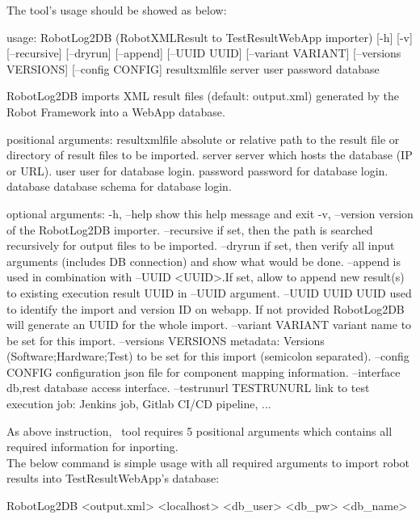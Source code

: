     The tool's usage should be showed as below:
\begin{robotlog}
usage: RobotLog2DB (RobotXMLResult to TestResultWebApp importer) [-h] [-v]
                    [--recursive] [--dryrun] [--append] [--UUID UUID]
                    [--variant VARIANT] [--versions VERSIONS] [--config CONFIG]
                    resultxmlfile server user password database

RobotLog2DB imports XML result files (default: output.xml) generated by the
                     Robot Framework into a WebApp database.

positional arguments:
resultxmlfile        absolute or relative path to the result file or directory
                     of result files to be imported.
server               server which hosts the database (IP or URL).
user                 user for database login.
password             password for database login.
database             database schema for database login.

optional arguments:
-h, --help           show this help message and exit
-v, --version        version of the RobotLog2DB importer.
--recursive          if set, then the path is searched recursively for output
                     files to be imported.
--dryrun             if set, then verify all input arguments (includes DB
                     connection) and show what would be done.
--append             is used in combination with --UUID <UUID>.If set, allow to
                     append new result(s) to existing execution result UUID in
                     --UUID argument.
--UUID UUID          UUID used to identify the import and version ID on webapp.
                     If not provided RobotLog2DB will generate an UUID for the
                     whole import.
--variant VARIANT    variant name to be set for this import.
--versions VERSIONS  metadata: Versions (Software;Hardware;Test) to be set for
                     this import (semicolon separated).
--config CONFIG      configuration json file for component mapping information.
--interface {db,rest} 
                     database access interface.
--testrunurl TESTRUNURL
                     link to test execution job: Jenkins job, Gitlab CI/CD pipeline, ...
\end{robotlog}

    As above instruction, \pkg\ tool requires 5 positional arguments which
    contains all required information for inporting.\\
    The below command is simple usage with all required arguments to import
    robot results into TestResultWebApp's database:
\begin{robotlog}
RobotLog2DB <output.xml> <localhost> <db\_user> <db\_pw> <db\_name>
\end{robotlog}

